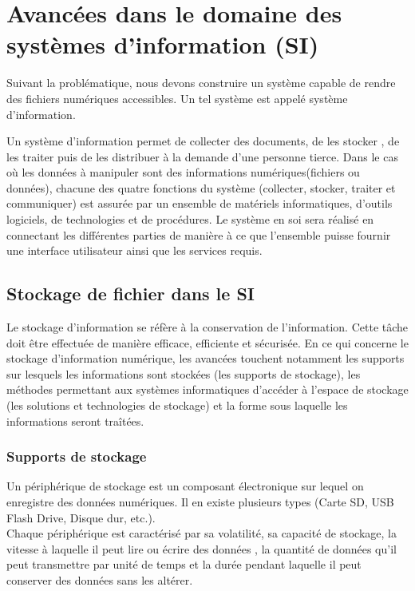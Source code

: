 \section{Avanc\'ees dans le domaine des syst\`emes d'information (SI)}
Suivant la probl\'ematique, nous devons construire un syst\`eme capable de rendre des fichiers num\'eriques accessibles.
Un tel syst\`eme est appel\'e syst\`eme d'information.%


\noindent Un syst\`eme d'information permet de collecter des documents, de les stocker , de les traiter puis de les distribuer \`a la demande d'une personne tierce. Dans le cas o\`u les donn\'ees \`a manipuler sont des informations num\'eriques(fichiers ou donn\'ees), chacune des quatre fonctions du syst\`eme (collecter, stocker, traiter et communiquer) est assur\'ee par un ensemble de mat\'eriels informatiques, d'outils logiciels, de technologies et de proc\'edures. Le syst\`eme en soi sera r\'ealis\'e en connectant les diff\'erentes parties de mani\`ere \`a ce que l'ensemble puisse fournir une interface utilisateur ainsi que les services requis.

\subsection{Stockage de fichier dans le SI}
Le stockage d'information se r\'ef\`ere \`a la conservation de l'information. Cette t\^ache doit \^etre effectu\'ee de mani\`ere efficace, efficiente et s\'ecuris\'ee. En ce qui concerne le stockage d'information num\'erique, les avanc\'ees touchent notamment les supports sur lesquels les informations sont stock\'ees (les supports de stockage), les m\'ethodes permettant aux syst\`emes informatiques d'acc\'eder \`a l'espace de stockage (les solutions et technologies de stockage) et la forme sous laquelle les informations seront tra\^it\'ees.



\subsubsection{Supports de stockage}
Un p\'eriph\'erique de stockage est un composant \'electronique sur lequel on enregistre des donn\'ees num\'eriques. Il en existe plusieurs types (Carte SD, USB Flash Drive, Disque dur, etc.).\\
Chaque p\'eriph\'erique est caract\'eris\'e par sa volatilit\'e, sa capacit\'e de stockage, la vitesse \`a laquelle il peut lire ou \'ecrire des donn\'ees , la quantit\'e de donn\'ees qu'il peut transmettre par unit\'e de temps et la dur\'ee pendant laquelle il peut conserver des donn\'ees sans les alt\'erer.\\

